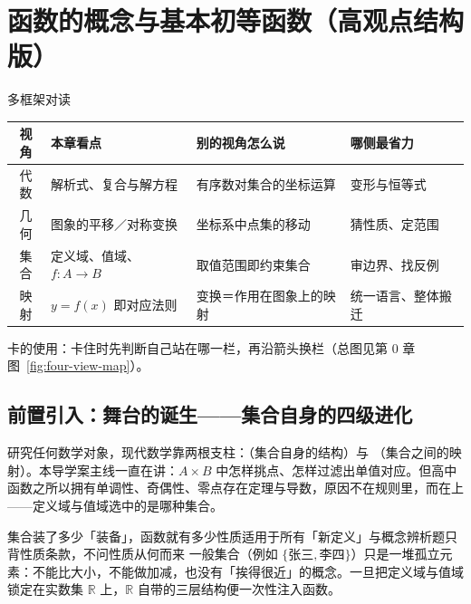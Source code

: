
\section{函数的概念与基本初等函数（高观点结构版）}

\begin{methodbox}{多框架对读}
\small
\begin{center}
\begin{tabular}{c|p{2.9cm}|p{5.0cm}|p{3.1cm}}
\toprule
视角 & 本章看点 & 别的视角怎么说 & 哪侧最省力 \\
\midrule
代数 & 解析式、复合与解方程 & 有序数对集合的坐标运算 & 变形与恒等式 \\
几何 & 图象的平移／对称变换 & 坐标系中点集的移动 & 猜性质、定范围 \\
集合 & 定义域、值域、$f:A\to B$ & 取值范围即约束集合 & 审边界、找反例 \\
映射 & $y=f(x)$ 即对应法则 & 变换＝作用在图象上的映射 & 统一语言、整体搬迁 \\
\bottomrule
\end{tabular}
\end{center}
卡的使用：卡住时先判断自己站在哪一栏，再沿箭头换栏（总图见第 0 章图~\ref{fig:four-view-map}）。
\end{methodbox}

\subsection{前置引入：舞台的诞生——集合自身的四级进化}

研究任何数学对象，现代数学靠两根支柱：（集合自身的结构）与 （集合之间的映射）。本导学案主线一直在讲：$A\times B$ 中怎样挑点、怎样过滤出单值对应。但高中函数之所以拥有单调性、奇偶性、零点存在定理与导数，原因不在规则里，而在上——定义域与值域选中的是哪种集合。

\begin{conccard}[一级]{集合装了多少「装备」，函数就有多少性质}{适用于所有「新定义」与概念辨析题}{只背性质条款，不问性质从何而来}
一般集合（例如 $\{\text{张三},\text{李四}\}$）只是一堆孤立元素：不能比大小，不能做加减，也没有「挨得很近」的概念。一旦把定义域与值域锁定在实数集 $\mathbb{R}$ 上，$\mathbb{R}$ 自带的三层结构便一次性注入函数。
\end{conccard}

